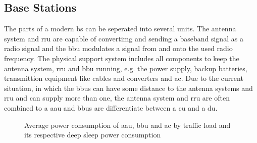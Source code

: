 \documentclass[11pt,a4paper]{article}
\begin{document}
\subsection{Base Stations}\label{subsec:BSConsumption}

The parts of a modern \acrshort{bs} can be seperated into several units.
The antenna system and \acrfull{rru} are capable of convertimg and sending a baseband signal as a radio signal and the \acrfull{bbu} modulates a signal from and onto the used radio frequency.
The physical support system includes all components to keep the antenna system, \acrshort{rru} and \acrshort{bbu} running, e.g. the power supply, backup batteries, transmittion equipment like cables and converters and \acrfull{ac}.
Due to the current situation, in which the \acrshort{bbu}s can have some distance to the antenna systems and \acrshort{rru} and can supply more than one, the antenna system and \acrshort{rru} are often combined to a \acrfull{aau} and \acrshort{bbu}s are differentiate between a \acrfull{cu} and a \acrfull{du}.

\begin{figure}[h]
  \centering
  \caption{Average power consumption of  \acrshort{aau}, \acrshort{bbu} and \acrshort{ac} by traffic load and its respective deep sleep power consumption \citep{green5G}}
  \label{fig:BSConsumption}
\end{figure}
\end{document}
